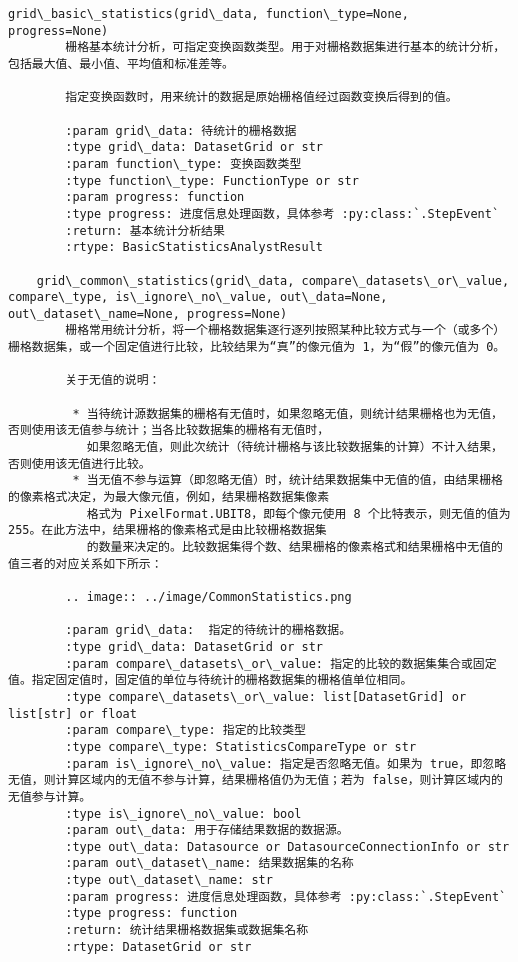 \documentclass[11pt]{article}
\begin{document}
\begin{Verbatim}[commandchars=\\\{\}]
    grid\_basic\_statistics(grid\_data, function\_type=None, progress=None)
        栅格基本统计分析，可指定变换函数类型。用于对栅格数据集进行基本的统计分析，包括最大值、最小值、平均值和标准差等。
        
        指定变换函数时，用来统计的数据是原始栅格值经过函数变换后得到的值。
        
        :param grid\_data: 待统计的栅格数据
        :type grid\_data: DatasetGrid or str
        :param function\_type: 变换函数类型
        :type function\_type: FunctionType or str
        :param progress: function
        :type progress: 进度信息处理函数，具体参考 :py:class:`.StepEvent`
        :return: 基本统计分析结果
        :rtype: BasicStatisticsAnalystResult
    
    grid\_common\_statistics(grid\_data, compare\_datasets\_or\_value, compare\_type, is\_ignore\_no\_value, out\_data=None, out\_dataset\_name=None, progress=None)
        栅格常用统计分析，将一个栅格数据集逐行逐列按照某种比较方式与一个（或多个）栅格数据集，或一个固定值进行比较，比较结果为“真”的像元值为 1，为“假”的像元值为 0。
        
        关于无值的说明：
        
         * 当待统计源数据集的栅格有无值时，如果忽略无值，则统计结果栅格也为无值，否则使用该无值参与统计；当各比较数据集的栅格有无值时，
           如果忽略无值，则此次统计（待统计栅格与该比较数据集的计算）不计入结果，否则使用该无值进行比较。
         * 当无值不参与运算（即忽略无值）时，统计结果数据集中无值的值，由结果栅格的像素格式决定，为最大像元值，例如，结果栅格数据集像素
           格式为 PixelFormat.UBIT8，即每个像元使用 8 个比特表示，则无值的值为 255。在此方法中，结果栅格的像素格式是由比较栅格数据集
           的数量来决定的。比较数据集得个数、结果栅格的像素格式和结果栅格中无值的值三者的对应关系如下所示：
        
        .. image:: ../image/CommonStatistics.png
        
        :param grid\_data:  指定的待统计的栅格数据。
        :type grid\_data: DatasetGrid or str
        :param compare\_datasets\_or\_value: 指定的比较的数据集集合或固定值。指定固定值时，固定值的单位与待统计的栅格数据集的栅格值单位相同。
        :type compare\_datasets\_or\_value: list[DatasetGrid] or list[str] or float
        :param compare\_type: 指定的比较类型
        :type compare\_type: StatisticsCompareType or str
        :param is\_ignore\_no\_value: 指定是否忽略无值。如果为 true，即忽略无值，则计算区域内的无值不参与计算，结果栅格值仍为无值；若为 false，则计算区域内的无值参与计算。
        :type is\_ignore\_no\_value: bool
        :param out\_data: 用于存储结果数据的数据源。
        :type out\_data: Datasource or DatasourceConnectionInfo or str
        :param out\_dataset\_name: 结果数据集的名称
        :type out\_dataset\_name: str
        :param progress: 进度信息处理函数，具体参考 :py:class:`.StepEvent`
        :type progress: function
        :return: 统计结果栅格数据集或数据集名称
        :rtype: DatasetGrid or str
    

\end{Verbatim}
\end{document}
